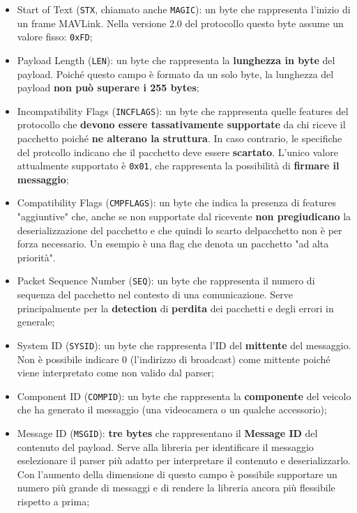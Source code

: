 \documentclass[a4paper, 12pt, oneside]{article}
\begin{document}
\begin{itemize}
    \item Start of Text (\texttt{STX}, chiamato anche \texttt{MAGIC}): un byte che rappresenta l'inizio di un frame MAVLink. Nella versione 2.0 del protocollo questo byte assume un valore fisso: \texttt{0xFD};
    \item Payload Length (\texttt{LEN}): un byte che rappresenta la \textbf{lunghezza in byte} del payload. Poiché questo campo è formato da un solo byte, la lunghezza del payload \textbf{non può superare i 255 bytes};
    \item Incompatibility Flags (\texttt{INCFLAGS}): un byte che rappresenta quelle features del protocollo che \textbf{devono essere tassativamente supportate} da chi riceve il pacchetto poiché \textbf{ne alterano la struttura}. In caso contrario, le specifiche del protcollo indicano che il pacchetto deve essere \textbf{scartato}. L'unico valore attualmente supportato è \texttt{0x01}, che rappresenta la possibilità di \textbf{firmare il messaggio};
    \item Compatibility Flags (\texttt{CMPFLAGS}): un byte che indica la presenza di features "aggiuntive" che, anche se non supportate dal ricevente \textbf{non pregiudicano} la deserializzazione del pacchetto e che quindi lo scarto delpacchetto non è per forza necessario. Un esempio è una flag che denota un pacchetto "ad alta priorità".
    \item Packet Sequence Number (\texttt{SEQ}): un byte che rappresenta il numero di sequenza del pacchetto nel contesto di una comunicazione. Serve principalmente per la \textbf{detection} di \textbf{perdita} dei pacchetti e degli errori in generale;
    \item System ID (\texttt{SYSID}): un byte che rappresenta l'ID del \textbf{mittente} del messaggio. Non è possibile indicare 0 (l'indirizzo di broadcast) come mittente poiché viene interpretato come non valido dal parser;
    \item Component ID (\texttt{COMPID}): un byte che rappresenta la \textbf{componente} del veicolo che ha generato il messaggio (una videocamera o un qualche accessorio);
    \item Message ID (\texttt{MSGID}): \textbf{tre bytes} che rappresentano il \textbf{Message ID} del contenuto del payload. Serve alla libreria per identificare il messaggio eselezionare il parser più adatto per interpretare il contenuto e deserializzarlo. Con l'aumento della dimensione di questo campo è possibile supportare un numero più grande di messaggi e di rendere la libreria ancora più flessibile rispetto a prima;

\end{itemize}
\end{document}

